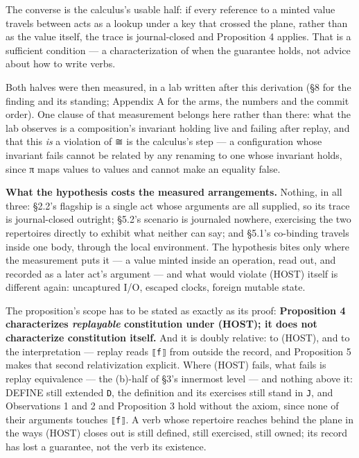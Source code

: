 \documentclass[
]{article}
\newcounter{none} %
\begin{document}
The converse is the calculus's usable half: if every reference to a
minted value travels between acts as a lookup under a key that crossed
the plane, rather than as the value itself, the trace is journal-closed
and Proposition 4 applies. That is a sufficient condition --- a
characterization of when the guarantee holds, not advice about how to
write verbs.

Both halves were then measured, in a lab written after this derivation
(§8 for the finding and its standing; Appendix A for the arms, the
numbers and the commit order). One clause of that measurement belongs
here rather than there: what the lab observes is a composition's
invariant holding live and failing after replay, and that this \emph{is}
a violation of ≅ is the calculus's step --- a configuration whose
invariant fails cannot be related by any renaming to one whose invariant
holds, since π maps values to values and cannot make an equality false.

\textbf{What the hypothesis costs the measured arrangements.} Nothing,
in all three: §2.2's flagship is a single act whose arguments are all
supplied, so its trace is journal-closed outright; §5.2's scenario is
journaled nowhere, exercising the two repertoires directly to exhibit
what neither can say; and §5.1's co-binding travels inside one body,
through the local environment. The hypothesis bites only where the
measurement puts it --- a value minted inside an operation, read out,
and recorded as a later act's argument --- and what would violate (HOST)
itself is different again: uncaptured I/O, escaped clocks, foreign
mutable state.

The proposition's scope has to be stated as exactly as its proof:
\textbf{Proposition 4 characterizes \emph{replayable} constitution under
(HOST); it does not characterize constitution itself.} And it is doubly
relative: to (HOST), and to the interpretation --- replay reads
\texttt{⟦f⟧} from outside the record, and Proposition 5 makes that
second relativization explicit. Where (HOST) fails, what fails is replay
equivalence --- the (b)-half of §3's innermost level --- and nothing
above it: DEFINE still extended \texttt{D}, the definition and its
exercises still stand in \texttt{J}, and Observations 1 and 2 and
Proposition 3 hold without the axiom, since none of their arguments
touches \texttt{⟦f⟧}. A verb whose repertoire reaches behind the plane
in the ways (HOST) closes out is still defined, still exercised, still
owned; its record has lost a guarantee, not the verb its existence.
\end{document}
